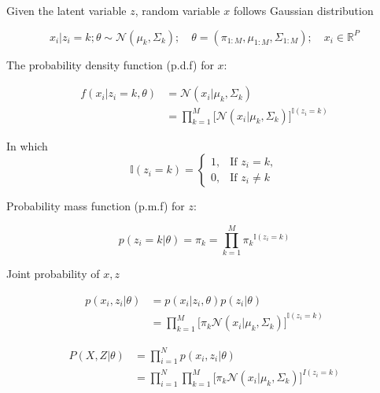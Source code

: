 Given the latent variable $z$, random variable $x$ follows Gaussian distribution

\begin{equation}
	x_i | z_i = k; \theta \sim \mathcal{N}(\mu_k, \Sigma_k); 
		\quad \theta = (\pi_{1:M}, \mu_{1:M}, \Sigma_{1:M});
		\quad x_i \in \mathbb{R}^P
\end{equation}

The probability density function (p.d.f) for $x$:

\begin{equation}
	\begin{aligned}
		f(x_i | z_i = k, \theta) & = \mathcal{N}(x_i | \mu_k, \Sigma_k) \\
		& = \prod_{k=1}^M {
				\bigg [ 
					\mathcal{N}(x_i | \mu_k, \Sigma_k)
				\bigg ]^{\mathbb{I}(z_i = k)}
			}
	\end{aligned}
\end{equation}

In which 
\begin{equation*}
    \mathbb{I}(z_i = k) = \begin{cases}
        1, & \text{If } z_i = k, \\
        0, & \text{If } z_i \neq k
    \end{cases}
\end{equation*}

Probability mass function (p.m.f) for $z$:

\begin{equation}
	p(z_i = k|\theta) = \pi_k = \prod_{k = 1}^M {
		\pi_k
	}^{\mathbb{I}(z_i = k)}
\end{equation}

Joint probability of $x, z$

\begin{equation}
    \begin{aligned}
       p(x_i, z_i | \theta) & = p(x_i | z_i, \theta) p(z_i | \theta) \\
       & = \prod_{k=1}^M {
			\bigg [
				\pi_k
				\mathcal{N}(x_i | \mu_k, \Sigma_k)
			\bigg ]
		}^{\mathbb{I}(z_i = k)}
    \end{aligned}
\end{equation}




\begin{equation}
    \begin{aligned}
        P(X,Z | \theta) & = \prod_{i=1}^N {p(x_i, z_i|\theta)} \\
            & = \prod_{i=1}^N{
                    \prod_{k=1}^M{
						\bigg [
							\pi_k
							\mathcal{N}(x_i|\mu_k, \Sigma_k)
						\bigg ]^{I(z_i = k)}
                    }
            }
    \end{aligned}
\end{equation}

